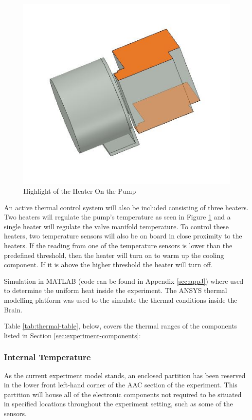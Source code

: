 \begin{figure}[H]
    \centering
    \includegraphics[width=0.5\linewidth]{4-experiment-design/img/Thermal/higlighted-heater-pump.JPG}
    \caption{Highlight of the Heater On the Pump}
    \label{fig:highlight-heater-on-pump}
\end{figure}

An active thermal control system will also be included consisting of three heaters. Two heaters will regulate the pump's temperature as seen in Figure \ref{fig:highlight-heater-on-pump} and a single heater will regulate the valve manifold temperature. To control these heaters, two temperature sensors will also be on board in close proximity to the heaters. If the reading from one of the temperature sensors is lower than the predefined threshold, then the heater will turn on to warm up the cooling component. If it is above the higher threshold the heater will turn off.

Simulation in MATLAB (code can be found in Appendix \ref{sec:appJ}) where used to determine the uniform heat inside the experiment. The ANSYS thermal modelling platform was used to the simulate the thermal conditions inside the Brain.

Table {\ref{tab:thermal-table}}, below, covers the thermal ranges of the components listed in Section \ref{sec:experiment-components}:



\raggedbottom

\subsubsection{Internal Temperature}
As the current experiment model stands, an enclosed partition has been reserved in the lower front left-hand corner of the AAC section of the experiment. This partition will house all of the electronic components not required to be situated in specified locations throughout the experiment setting, such as some of the sensors.

